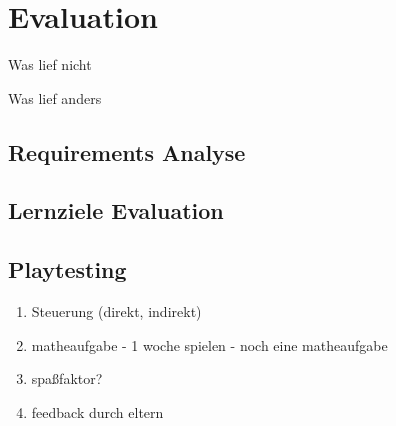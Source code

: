 \section{Evaluation}
	Was lief nicht

	Was lief anders
\subsection{Requirements Analyse}
\subsection{Lernziele Evaluation}
\subsection{Playtesting}
	\begin{enumerate}
		\item{ Steuerung (direkt, indirekt) }
		\item{ matheaufgabe - 1 woche spielen - noch eine matheaufgabe }
		\item{ spaßfaktor? }
		\item{ feedback durch eltern }
	\end{enumerate}
